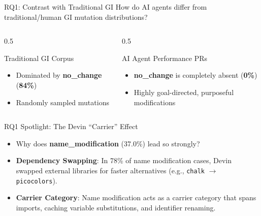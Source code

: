 \documentclass[aspectratio=169]{beamer}
\begin{document}
\begin{frame}{RQ1: Contrast with Traditional GI}
  How do AI agents differ from traditional/human GI mutation distributions?
  
  \begin{columns}
    \begin{column}{0.5\textwidth}
      \begin{block}{Traditional GI Corpus}
        \begin{itemize}
          \item Dominated by \textbf{no\_change} (\textbf{84\%})
          \item Randomly sampled mutations
        \end{itemize}
      \end{block}
    \end{column}
    
    \begin{column}{0.5\textwidth}
      \begin{block}{AI Agent Performance PRs}
        \begin{itemize}
          \item \textbf{no\_change} is completely absent (\textbf{0\%})
          \item Highly goal-directed, purposeful modifications
        \end{itemize}
      \end{block}
    \end{column}
  \end{columns}
\end{frame}

\begin{frame}{RQ1 Spotlight: The Devin ``Carrier'' Effect}
  \begin{itemize}
    \item Why does \textbf{name\_modification} (37.0\%) lead so strongly?
    \item \textbf{Dependency Swapping}: In 78\% of name modification cases, Devin swapped external libraries for faster alternatives (e.g., \texttt{chalk} $\rightarrow$ \texttt{picocolors}).
    \item \textbf{Carrier Category}: Name modification acts as a carrier category that spans imports, caching variable substitutions, and identifier renaming.
  \end{itemize}
\end{frame}
\end{document}
